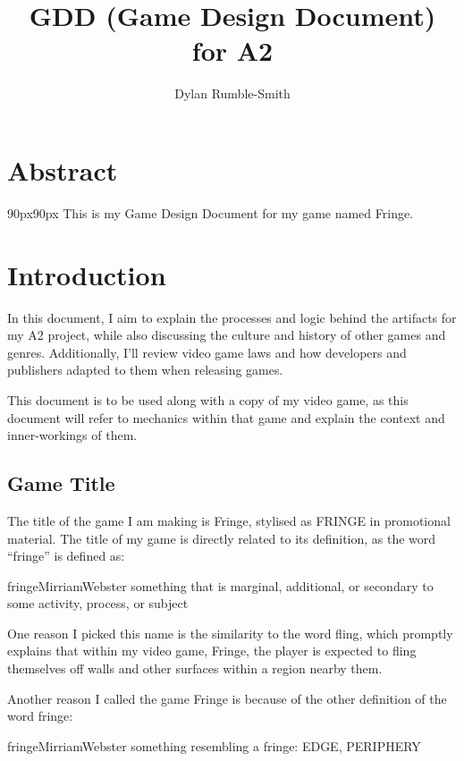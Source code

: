 \documentclass[12pt]{article}
\title{GDD (Game Design Document) for A2}
\author{Dylan Rumble-Smith}
\begin{document}
	{\setlength{\parskip}{0pt}%
		\maketitle
		
		\section*{\centering Abstract}
		\begin{adjustwidth}{90px}{90px}
			This is my Game Design Document for my game named Fringe.
		\end{adjustwidth}
		\pagebreak
		\tableofcontents
		\pagebreak
		}
	
	\section{Introduction}
	In this document, I aim to explain the processes and logic behind the artifacts for my A2 project, while also discussing the culture and history of other games and genres. Additionally, I'll review video game laws and how developers and publishers adapted to them when releasing games.
	
	This document is to be used along with a copy of my video game, as this document will refer to mechanics within that game and explain the context and inner-workings of them.
	\subsection{Game Title}
	The title of the game I am making is Fringe, stylised as FRINGE in promotional material. The title of my game is directly related to its definition, as the word “fringe” is defined as:
	\begin{displaycquote}{fringeMirriamWebster}
		something that is marginal, additional, or secondary to some activity, process, or subject
	\end{displaycquote}
	
	One reason I picked this name is the similarity to the word fling, which promptly explains that within my video game, Fringe, the player is expected to fling themselves off walls and other surfaces within a region nearby them.
	
	Another reason I called the game Fringe is because of the other definition of the word fringe:
	\begin{displaycquote}{fringeMirriamWebster}
		something resembling a fringe: EDGE, PERIPHERY
	\end{displaycquote}
	
\end{document}
